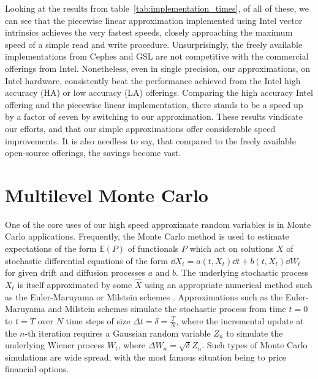 \documentclass[manuscript,review]{acmart}
\begin{document}
Looking at the results from table~\ref{tab:implementation_times}, of all of these, we can see that the piecewise linear approximation implemented using Intel vector intrinsics achieves the very fastest speeds, closely approaching the maximum speed of a simple read and write procedure. Unsurprisingly, the freely available implementations from Cephes and GSL are not competitive with the commercial offerings from Intel. Nonetheless, even in single precision, our approximations, on Intel hardware, consistently beat the performance achieved from the Intel high accuracy (HA) or low accuracy (LA) offerings. Comparing the high accuracy Intel offering and the piecewise linear implementation, there stands to be a speed up by a factor of seven by switching to our approximation. These results vindicate our efforts, and that our simple approximations offer considerable speed improvements. It is also needless to say, that compared to the freely available open-source offerings, the savings become vast. 

\section{Multilevel Monte Carlo}
\label{sec:multilevel_monte_carlo}

One of the core uses of our high speed approximate random variables is in Monte Carlo applications. Frequently, the Monte Carlo method is used to estimate expectations of the form $ \mathbb{E}(P) $ of functionals $ P $ which act on solutions $ X $ of stochastic differential equations of the form $ \dd{X_t} = a(t, X_t) \dd{t} + b(t, X_t)\dd{W_t} $ for given drift and diffusion processes $ a $ and $ b $. The underlying stochastic process $ X_t $ is itself approximated by some $ \hat{X} $ using an appropriate numerical method such as the Euler-Maruyama or Milstein schemes \citep{asmussen2007stochastic,kloeden1999numerical,lord2014introduction}. Approximations such as the Euler-Maruyama and Milstein schemes simulate the stochastic process from time $ t = 0 $ to $ t = T $ over $ N $ time steps of size $ \Delta t = \delta = \tfrac{T}{N} $, where the incremental update at the $ n $-th iteration requires a Gaussian random variable $ Z_n $ to simulate the underlying Wiener process $ W_t $, where $ \Delta W_n = \sqrt{\delta}Z_n $. Such types of Monte Carlo simulations are wide spread, with the most famous situation being to price financial options. 
\end{document}
